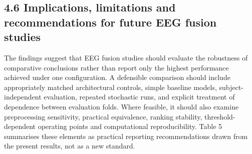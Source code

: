 \documentclass[11pt,a4paper]{article}
\begin{document}
\subsection{4.6 Implications, limitations and recommendations for future EEG fusion studies}\label{implications-limitations-and-recommendations-for-future-eeg-fusion-studies}

The findings suggest that EEG fusion studies should evaluate the robustness of
comparative conclusions rather than report only the highest performance achieved under
one configuration. A defensible comparison should include appropriately matched
architectural controls, simple baseline models, subject-independent evaluation, repeated
stochastic runs, and explicit treatment of dependence between evaluation folds. Where
feasible, it should also examine preprocessing sensitivity, practical equivalence,
ranking stability, threshold-dependent operating points and computational
reproducibility. Table 5 summarises these elements as practical reporting
recommendations drawn from the present results, not as a new standard.

\begingroup\footnotesize
\end{document}
